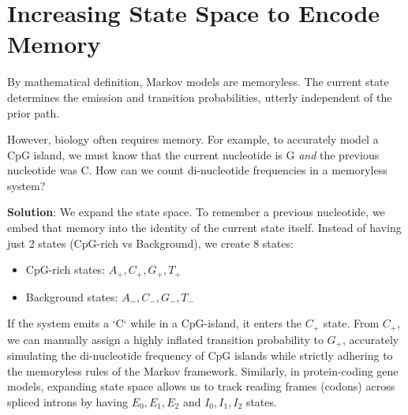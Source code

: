 \section{Increasing State Space to Encode Memory}

By mathematical definition, Markov models are memoryless. The current state determines the emission and transition probabilities, utterly independent of the prior path. 

However, biology often requires memory. For example, to accurately model a CpG island, we must know that the current nucleotide is G \textit{and} the previous nucleotide was C. How can we count di-nucleotide frequencies in a memoryless system?

\textbf{Solution}: We expand the state space.
To remember a previous nucleotide, we embed that memory into the identity of the current state itself. Instead of having just 2 states (CpG-rich vs Background), we create 8 states:
\begin{itemize}
    \item CpG-rich states: $A_+, C_+, G_+, T_+$
    \item Background states: $A_-, C_-, G_-, T_-$
\end{itemize}


If the system emits a `C` while in a CpG-island, it enters the $C_+$ state. From $C_+$, we can manually assign a highly inflated transition probability to $G_+$, accurately simulating the di-nucleotide frequency of CpG islands while strictly adhering to the memoryless rules of the Markov framework. Similarly, in protein-coding gene models, expanding state space allows us to track reading frames (codons) across spliced introns by having $E_0, E_1, E_2$ and $I_0, I_1, I_2$ states.

